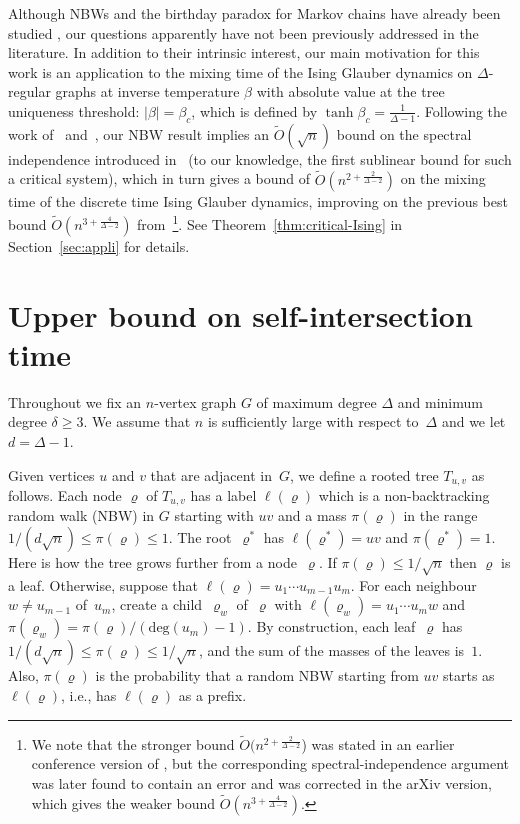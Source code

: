 \documentclass[11pt,a4paper]{article}
\theoremstyle{plain}
\def\nn{\sqrt{n}}
\def\deg{\mathrm{deg}}
\let\rho=\varrho
\begin{document}
 
Although NBWs and the birthday paradox for Markov chains have already been studied \cite{ABLS, kim2008birthday},  our questions apparently have not been previously addressed in the literature. 
In addition to their intrinsic interest, our main motivation for this work is an application to the mixing time of the Ising Glauber dynamics on $\Delta$-regular graphs at inverse temperature $\beta$ with absolute value at the tree uniqueness threshold: $|\beta|=\beta_c$, which is defined by $\tanh \beta_c = \frac{1}{\Delta-1}$. Following the work of~\cite{chen2020contraction} and~\cite{chen2025uniqueness}, our NBW result implies an $\widetilde{O}(\sqrt{n})$ bound on the spectral independence introduced in~\cite{anari2021spectral} (to our knowledge, the first sublinear bound for such a critical system), which in turn gives a bound of $\widetilde{O}\!\left(n^{2+ \frac{2}{\Delta - 2}}\right)$ on the mixing time of the discrete time Ising Glauber dynamics, improving on the previous best bound $\widetilde{O}\!\left(n^{3+\frac{4}{\Delta-2}}\right)$ from~\cite{chen2025uniqueness}\footnote{We note that the stronger bound $\widetilde{O}(n^{2+\frac{2}{\Delta-2}}$) was stated in an earlier conference version of \cite{chen2025uniqueness}, but the corresponding spectral-independence argument was later found to contain an error and was corrected in the arXiv version, which gives the weaker bound $\widetilde{O}\!\left(n^{3+\frac{4}{\Delta-2}}\right)$.}. 
See Theorem~\ref{thm:critical-Ising} in Section~\ref{sec:appli} for details. 




\section{Upper bound on self-intersection time}
Throughout we fix an $n$-vertex graph $G$ of maximum degree $\Delta$ and minimum degree $\delta\ge 3$.  
We assume that $n$ is sufficiently large with respect to~$\Delta $ and we let   $d= \Delta-1$. 
 
Given vertices $u$ and $v$ that are adjacent in~$G$,
we define a rooted tree $T_{u,v}$ as follows.
Each node $\rho$ of $T_{u,v}$ has a label $\ell(\rho)$ 
which is a non-backtracking random walk (NBW) in $G$ starting with $uv$
and a mass $\pi(\rho)$ in the range $1/(d\nn) \leq \pi(\rho) \leq 1$. 
The root~$\rho^*$ has $\ell(\rho^*) = uv$ and $\pi(\rho^*) = 1$.
Here is how the tree grows further from a node~$\rho$. If $\pi(\rho) \leq 1/\nn$ then $\rho$ is a leaf. Otherwise, suppose that $\ell(\rho) = u_1 \cdots u_{m-1} u_m$. For each neighbour~$w\neq u_{m-1}$ of~$u_m$, create a child~$\rho_w$ of~$\rho$ with $\ell(\rho_w) = u_1
\cdots u_m w$ and $\pi(\rho_w) = \pi(\rho)/(\deg(u_m)-1)$.
By construction, each leaf~$\rho$ has
$1/(d\nn) \leq \pi(\rho) \leq 1/\nn$, and the sum of the masses of the leaves is~$1$. Also, $\pi(\rho)$ is the probability that a random NBW starting from $uv$ starts as $\ell(\rho)$, i.e., has $\ell(\rho)$ as a prefix.
\end{document}
